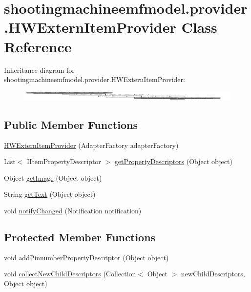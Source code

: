 \hypertarget{classshootingmachineemfmodel_1_1provider_1_1_h_w_extern_item_provider}{\section{shootingmachineemfmodel.\-provider.\-H\-W\-Extern\-Item\-Provider Class Reference}
\label{classshootingmachineemfmodel_1_1provider_1_1_h_w_extern_item_provider}
}
Inheritance diagram for shootingmachineemfmodel.\-provider.\-H\-W\-Extern\-Item\-Provider\-:\begin{figure}[H]
\begin{center}
\leavevmode
\includegraphics[height=0.534759cm]{classshootingmachineemfmodel_1_1provider_1_1_h_w_extern_item_provider}
\end{center}
\end{figure}
\subsection*{Public Member Functions}
\begin{DoxyCompactItemize}
\item 
\hyperlink{classshootingmachineemfmodel_1_1provider_1_1_h_w_extern_item_provider_a7ada3413887acf253998b1501b7b9271}{H\-W\-Extern\-Item\-Provider} (Adapter\-Factory adapter\-Factory)
\item 
List$<$ I\-Item\-Property\-Descriptor $>$ \hyperlink{classshootingmachineemfmodel_1_1provider_1_1_h_w_extern_item_provider_ae8cacb516762ed4e3931fe825a856d20}{get\-Property\-Descriptors} (Object object)
\item 
Object \hyperlink{classshootingmachineemfmodel_1_1provider_1_1_h_w_extern_item_provider_aa236eb6413fc016076750460b7572ce5}{get\-Image} (Object object)
\item 
String \hyperlink{classshootingmachineemfmodel_1_1provider_1_1_h_w_extern_item_provider_a7ce9c39f8a5a098ec4956046bd258de2}{get\-Text} (Object object)
\item 
void \hyperlink{classshootingmachineemfmodel_1_1provider_1_1_h_w_extern_item_provider_a119d55f93173d6bc7409116d1099dec1}{notify\-Changed} (Notification notification)
\end{DoxyCompactItemize}
\subsection*{Protected Member Functions}
\begin{DoxyCompactItemize}
\item 
void \hyperlink{classshootingmachineemfmodel_1_1provider_1_1_h_w_extern_item_provider_a68a9801c249127b320e2e9949c6086bf}{add\-Pinnumber\-Property\-Descriptor} (Object object)
\item 
void \hyperlink{classshootingmachineemfmodel_1_1provider_1_1_h_w_extern_item_provider_a9d14990b7f8311e0d306866fbd489a60}{collect\-New\-Child\-Descriptors} (Collection$<$ Object $>$ new\-Child\-Descriptors, Object object)
\end{DoxyCompactItemize}


